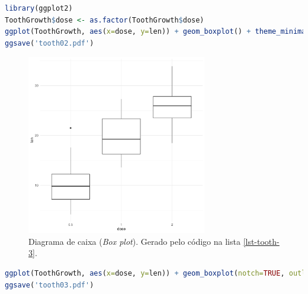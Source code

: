 \begin{frame}
\framebreak

\begin{lstlisting}[language=R, label=lst-tooth-3, caption={Box plot.}, postbreak=\mbox{$\hookrightarrow$\space}, basicstyle=\fontsize{8}{10}\selectfont\ttfamily]
library(ggplot2)
ToothGrowth$dose <- as.factor(ToothGrowth$dose)
ggplot(ToothGrowth, aes(x=dose, y=len)) + geom_boxplot() + theme_minimal()
ggsave('tooth02.pdf')
\end{lstlisting}

\begin{figure}[h]
 \centering
  \includegraphics[width=0.7\textwidth,height=0.7\textheight,keepaspectratio]{figures/tooth02.pdf}
 \caption{Diagrama de caixa (\emph{Box plot}). Gerado pelo código na lista \ref{lst-tooth-3}.}
 \label{fig-tooth02}
\end{figure}

\framebreak

\begin{lstlisting}[language=R, label=lst-tooth-4, caption={Box plot.}, postbreak=\mbox{$\hookrightarrow$\space}, basicstyle=\fontsize{8}{10}\selectfont\ttfamily]
ggplot(ToothGrowth, aes(x=dose, y=len)) + geom_boxplot(notch=TRUE, outlier.colour="red", outlier.shape=8, outlier.size=4) + coord_flip() + theme_minimal()
ggsave('tooth03.pdf')
\end{lstlisting}


\end{frame}
